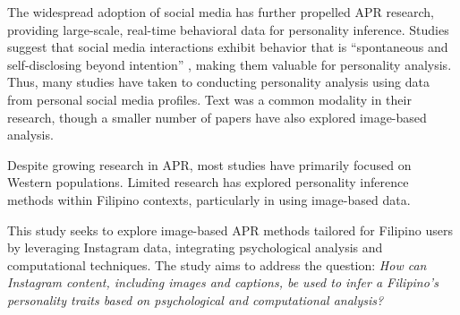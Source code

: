The widespread adoption of social media has further propelled APR research, providing large-scale, real-time behavioral data for personality inference. Studies suggest that social media interactions exhibit behavior that is “spontaneous and self-disclosing beyond intention” \citep{Vinciarelli2014}, making them valuable for personality analysis. Thus, many studies have taken to conducting personality analysis using data from personal social media profiles. Text was a common modality in their research, though a smaller number of papers have also explored image-based analysis. 

Despite growing research in APR, most studies have primarily focused on Western populations. Limited research has explored personality inference methods within Filipino contexts, particularly in using image-based data.



This study seeks to explore image-based APR methods tailored for Filipino users by leveraging Instagram data, integrating psychological analysis and computational techniques. The study aims to address the question: \textit{How can Instagram content, including images and captions, be used to infer a Filipino’s personality traits based on psychological and computational analysis?}





